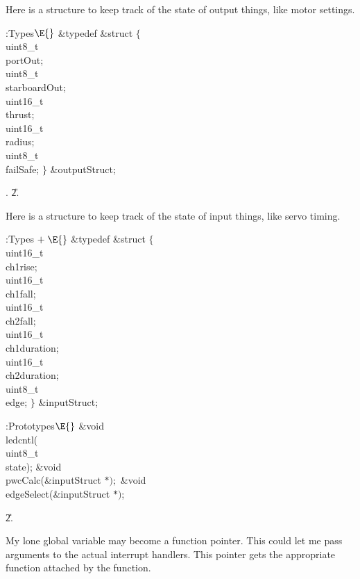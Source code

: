 Here is a structure to keep track of the state of output things,
like motor settings.

\Y\B\4:Types\X${}\E{}$\6
\&{typedef} \&{struct} ${}\{{}$\1\6
\\{uint8\_t}\\{portOut};\6
\\{uint8\_t}\\{starboardOut};\6
\\{uint16\_t}\\{thrust};\6
\\{uint16\_t}\\{radius};\6
\\{uint8\_t}\\{failSafe};\2\6
${}\}{}$ \&{outputStruct};\par
{}.
\U2.\fi

Here is a structure to keep track of the state of input things,
like servo timing.

\Y\B\4:Types\X${}\mathrel+\E{}$\6
\&{typedef} \&{struct} ${}\{{}$\1\6
\\{uint16\_t}\\{ch1rise};\6
\\{uint16\_t}\\{ch1fall};\6
\\{uint16\_t}\\{ch2fall};\6
\\{uint16\_t}\\{ch1duration};\6
\\{uint16\_t}\\{ch2duration};\6
\\{uint8\_t}\\{edge};\2\6
${}\}{}$ \&{inputStruct};\par
\fi

\B{}:Prototypes\X${}\E{}$\6
\&{void} \\{ledcntl}(\\{uint8\_t}\\{state});\6
\&{void} \\{pwcCalc}(\&{inputStruct} ${}{*});{}$\6
\&{void} \\{edgeSelect}(\&{inputStruct} ${}{*}){}$;\par
\U2.\fi

My lone global variable may become a function pointer.
This could let me pass arguments to the actual interrupt handlers.
This pointer gets the appropriate function attached by the 
function.

